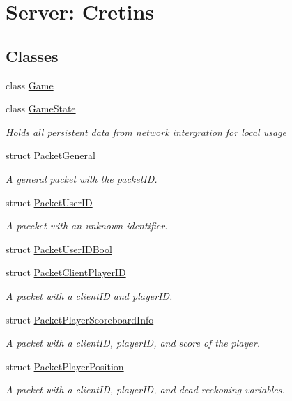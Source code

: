 \hypertarget{group__server}{\section{Server\-: Cretins}
\label{group__server}
}
\subsection*{Classes}
\begin{DoxyCompactItemize}
\item 
class \hyperlink{class_game}{Game}
\item 
class \hyperlink{class_game_state}{Game\-State}
\begin{DoxyCompactList}\small\item\em Holds all persistent data from network intergration for local usage \end{DoxyCompactList}\item 
struct \hyperlink{struct_packet_general}{Packet\-General}
\begin{DoxyCompactList}\small\item\em A general packet with the packet\-I\-D. \end{DoxyCompactList}\item 
struct \hyperlink{struct_packet_user_i_d}{Packet\-User\-I\-D}
\begin{DoxyCompactList}\small\item\em A paccket with an unknown identifier. \end{DoxyCompactList}\item 
struct \hyperlink{struct_packet_user_i_d_bool}{Packet\-User\-I\-D\-Bool}
\item 
struct \hyperlink{struct_packet_client_player_i_d}{Packet\-Client\-Player\-I\-D}
\begin{DoxyCompactList}\small\item\em A packet with a client\-I\-D and player\-I\-D. \end{DoxyCompactList}\item 
struct \hyperlink{struct_packet_player_scoreboard_info}{Packet\-Player\-Scoreboard\-Info}
\begin{DoxyCompactList}\small\item\em A packet with a client\-I\-D, player\-I\-D, and score of the player. \end{DoxyCompactList}\item 
struct \hyperlink{struct_packet_player_position}{Packet\-Player\-Position}
\begin{DoxyCompactList}\small\item\em A packet with a client\-I\-D, player\-I\-D, and dead reckoning variables. \end{DoxyCompactList}\item 

\end{DoxyCompactItemize}
